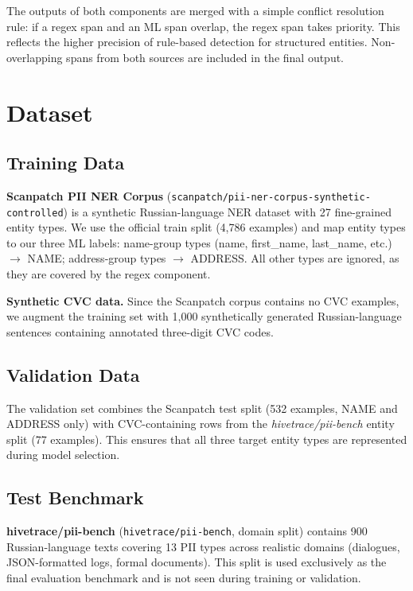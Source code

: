 \documentclass{article}
\begin{document}
The outputs of both components are merged with a simple conflict resolution rule: if a regex span and an ML span overlap, the regex span takes priority. This reflects the higher precision of rule-based detection for structured entities. Non-overlapping spans from both sources are included in the final output.

\section{Dataset}
\label{sec:dataset}

\subsection{Training Data}

\textbf{Scanpatch PII NER Corpus} (\texttt{scanpatch/pii-ner-corpus-synthetic-controlled}) is a synthetic Russian-language NER dataset with 27 fine-grained entity types. We use the official train split (4,786 examples) and map entity types to our three ML labels: name-group types (name, first\_name, last\_name, etc.) $\to$ NAME; address-group types $\to$ ADDRESS. All other types are ignored, as they are covered by the regex component.

\textbf{Synthetic CVC data.} Since the Scanpatch corpus contains no CVC examples, we augment the training set with 1,000 synthetically generated Russian-language sentences containing annotated three-digit CVC codes.

\subsection{Validation Data}

The validation set combines the Scanpatch test split (532 examples, NAME and ADDRESS only) with CVC-containing rows from the \textit{hivetrace/pii-bench} entity split (77 examples). This ensures that all three target entity types are represented during model selection.

\subsection{Test Benchmark}

\textbf{hivetrace/pii-bench} (\texttt{hivetrace/pii-bench}, domain split) contains 900 Russian-language texts covering 13 PII types across realistic domains (dialogues, JSON-formatted logs, formal documents). This split is used exclusively as the final evaluation benchmark and is not seen during training or validation.
\end{document}
